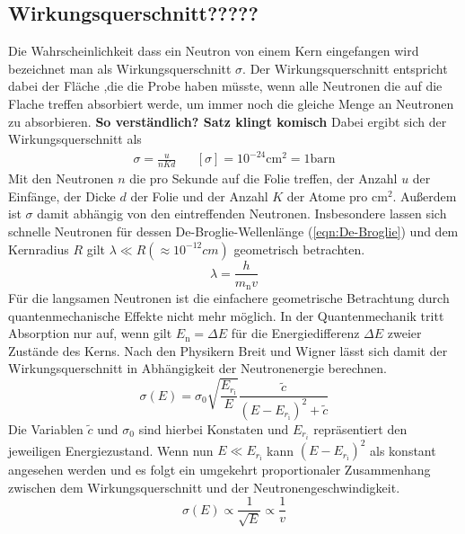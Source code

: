 \subsection{Wirkungsquerschnitt?????}
Die Wahrscheinlichkeit dass ein Neutron von einem Kern eingefangen wird bezeichnet man als Wirkungsquerschnitt $\sigma$.
Der Wirkungsquerschnitt entspricht  dabei der Fläche ,die die Probe haben müsste, wenn alle Neutronen die auf die Flache treffen absorbiert werde, um immer noch die gleiche Menge an Neutronen zu absorbieren.
\textbf{So verständlich? Satz klingt komisch}
Dabei ergibt sich der Wirkungsquerschnitt als 
\begin{align}
    \sigma = \frac{u}{nKd} && [\sigma] = 10^{-24} \text{cm}^2 = 1 \text{barn}
\end{align}
Mit den Neutronen $n$ die pro Sekunde auf die Folie treffen, der Anzahl $u$ der Einfänge, der Dicke $d$ der Folie und der Anzahl $K$ der Atome pro $\text{cm}^2$.
Außerdem ist $\sigma$ damit abhängig von den eintreffenden Neutronen.
Insbesondere lassen sich schnelle Neutronen für dessen De-Broglie-Wellenlänge (\ref{eqn:De-Broglie}) und dem Kernradius $R$ gilt $\lambda \ll R (≈10^{-12}cm) $ geometrisch betrachten.
\begin{equation}
     \lambda = \frac{h}{m_{\text{n}} v} \label{eqn:De-Broglie}
\end{equation}
Für die langsamen Neutronen ist die einfachere geometrische Betrachtung durch quantenmechanische Effekte nicht mehr möglich.
In der Quantenmechanik tritt Absorption nur auf, wenn gilt $E_{\text{n}} = \Delta E$ für die Energiedifferenz $\Delta E$ zweier Zustände des Kerns.
Nach den Physikern Breit und Wigner lässt sich damit der Wirkungsquerschnitt in Abhängigkeit der Neutronenergie berechnen.
\begin{equation}
    \sigma(E) = \sigma_0 \sqrt{\frac{E_{r_{\text{i}}}}{E}} \frac{\tilde{c}}{\left(E-E_{r_{\text{i}}}\right)^2 + \tilde{c}}
\end{equation}
Die Variablen $\tilde{c}$ und $\sigma_0$ sind hierbei Konstaten und $E_{r_i}$ repräsentiert den jeweiligen Energiezustand.
Wenn nun $E \ll E_{r_{\text{i}}}$ kann $\left(E-E_{r_{\text{i}}}\right)^2$ als konstant angesehen werden und es folgt ein umgekehrt proportionaler Zusammenhang zwischen dem Wirkungsquerschnitt und der Neutronengeschwindigkeit.
\begin{equation}
    \sigma(E) \propto \frac{1}{\sqrt{E}} \propto \frac{1}{v}
\end{equation}

